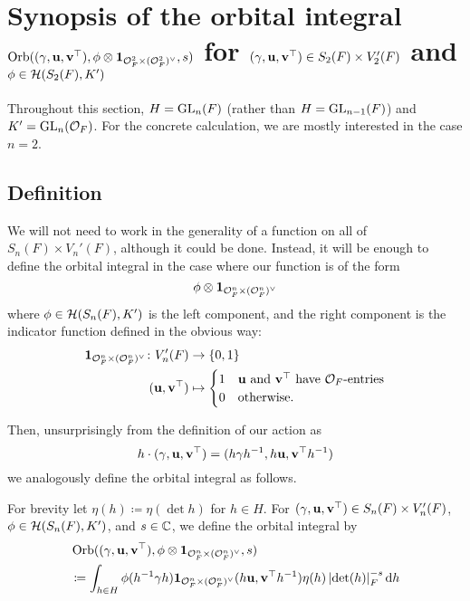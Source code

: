 \section{Synopsis of the orbital integral
  $\operatorname{Orb}((\gamma, \mathbf u, \mathbf v^\top), \phi \otimes \mathbf{1}_{\mathcal O_F^2 \times (\mathcal O_F^2)^\vee}, s)$
  for $(\gamma, \mathbf u, \mathbf v^\top) \in S_2(F) \times V'_2(F)$ and $\phi \in \mathcal H(S_2(F), K')$}

Throughout this section, $H = \operatorname{GL}_n(F)$ (rather than $H = \operatorname{GL}_{n-1}(F)$)
and $K' = \operatorname{GL}_n(\mathcal O_F)$.
For the concrete calculation, we are mostly interested in the case $n = 2$.

\subsection{Definition}
We will not need to work in the generality of a function
on all of $S_n(F) \times V_n'(F)$, although it could be done.
Instead, it will be enough to define the orbital integral
in the case where our function is of the form
\[ \phi \otimes \mathbf{1}_{\mathcal O_F^n \times (\mathcal O_F^n)^\vee} \]
where $\phi \in \mathcal H(S_n(F), K')$ is the left component, and
the right component is the indicator function defined in the obvious way:
\begin{align*}
  \mathbf{1}_{\mathcal O_F^n \times (\mathcal O_F^n)^\vee} \colon V'_n(F) &\to \{0,1\} \\
  (\mathbf u, \mathbf v^\top) &\mapsto
  \begin{cases}
    1 & \mathbf u \text{ and } \mathbf v^\top \text{ have } \mathcal O_F \text{-entries} \\
    0 & \text{otherwise}.
  \end{cases}
\end{align*}

Then, unsurprisingly from the definition of our action as
\[ h \cdot (\gamma, \mathbf u, \mathbf v^\top) = (h\gamma h^{-1}, h\mathbf u, \mathbf v^\top h^{-1}) \]
we analogously define the orbital integral as follows.
\begin{definition}
  For brevity let $\eta(h) \coloneqq \eta(\det h)$ for $h \in H$.
  For $(\gamma, \mathbf u, \mathbf v^\top) \in S_n(F) \times V'_n(F)$,
  $\phi \in \mathcal H(S_n(F), K')$, and $s \in \mathbb C$,
  we define the orbital integral by
  \begin{align*}
    & \Orb((\gamma, \uu, \vv^\top), \phi \otimes \mathbf{1}_{\OO_F^n \times (\OO_F^n)^\vee}, s) \\
    &\coloneqq
    \int_{h \in H} \phi(h\inv \gamma h)
    \mathbf{1}_{\OO_F^n \times (\OO_F^n)^\vee}(h \uu, \vv^\top h^{-1})
    \eta(h) \left\lvert \det(h) \right\rvert_F^{-s} \odif h
  \end{align*}
\end{definition}

